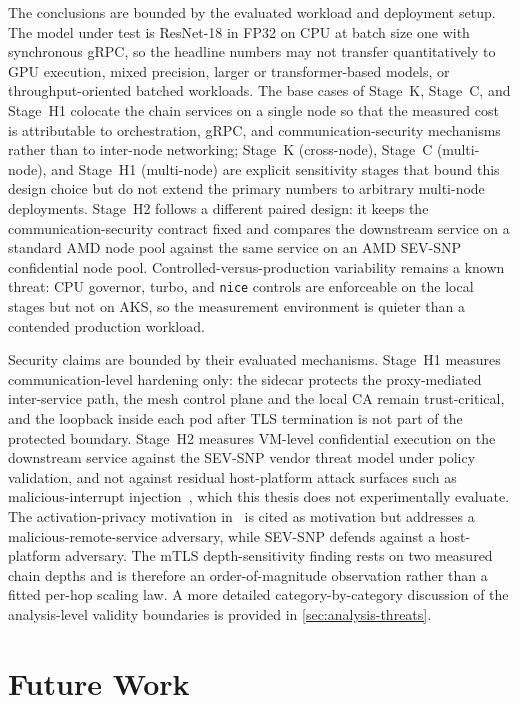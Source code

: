 The conclusions are bounded by the evaluated workload and deployment
setup. The model under test is ResNet-18 in FP32 on CPU at batch
size one with synchronous gRPC, so the headline numbers may not
transfer quantitatively to GPU execution, mixed precision, larger or
transformer-based models, or throughput-oriented batched workloads.
The base cases of Stage~K, Stage~C, and Stage~H1 colocate the chain
services on a single node so that the measured cost is attributable to
orchestration, gRPC, and communication-security mechanisms rather than
to inter-node networking; Stage~K (cross-node), Stage~C (multi-node), and
Stage~H1 (multi-node) are explicit sensitivity stages that bound this
design choice but do not extend the primary numbers to arbitrary
multi-node deployments. Stage~H2 follows a different paired design: it
keeps the communication-security contract fixed and compares the
downstream service on a standard AMD node pool against the same service
on an AMD SEV-SNP confidential node pool.
Controlled-versus-production variability remains a known threat:
CPU governor, turbo, and \texttt{nice} controls are enforceable on
the local stages but not on AKS, so the measurement environment is
quieter than a contended production workload.

Security claims are bounded by their evaluated mechanisms. Stage~H1
measures communication-level hardening only: the sidecar protects
the proxy-mediated inter-service path, the mesh control plane and
the local CA remain trust-critical, and the loopback inside each
pod after TLS termination is not part of the protected boundary.
Stage~H2 measures VM-level confidential execution on the downstream
service against the SEV-SNP vendor threat model under policy
validation, and not against residual host-platform attack surfaces
such as malicious-interrupt
injection~\cite{schluter2024_heckler}, which this thesis does not
experimentally evaluate. The activation-privacy motivation
in~\cite{he2021_attacking_collaborative} is cited as motivation but
addresses a malicious-remote-service adversary, while SEV-SNP
defends against a host-platform adversary. The mTLS depth-sensitivity
finding rests on two measured chain depths and is therefore an
order-of-magnitude observation rather than a fitted per-hop scaling
law. A more detailed category-by-category discussion of the
analysis-level validity boundaries is provided in
\cref{sec:analysis-threats}.

\section{Future Work}

